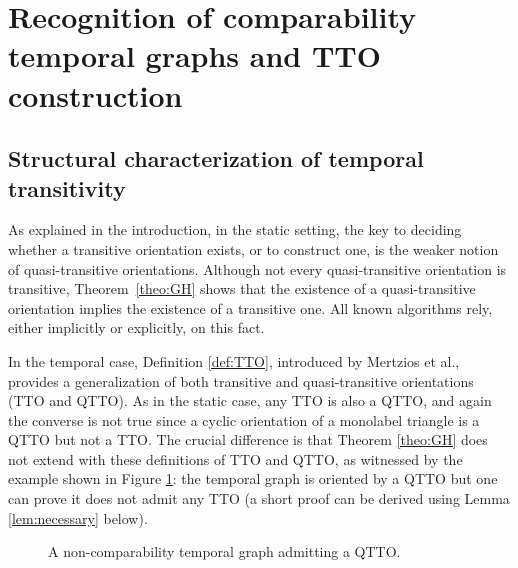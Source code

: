 \documentclass[runningheads]{llncs}
\begin{document}
\section{Recognition of comparability temporal graphs and TTO construction}
\label{sect:tto-algorithm}



\subsection{Structural characterization of temporal transitivity}

As explained in the introduction, in the static setting, the key to deciding whether a transitive orientation exists, or to construct one, is the weaker notion of quasi-transitive orientations. Although not every quasi-transitive orientation is transitive, Theorem~\ref{theo:GH} shows that the existence of a quasi-transitive orientation implies the existence of a transitive one. All known algorithms rely, either implicitly or explicitly, on this fact.


In the temporal case, Definition \ref{def:TTO}, introduced by Mertzios et al., provides a generalization of both transitive and quasi-transitive orientations (TTO and QTTO). As in the static case, any TTO  is also a QTTO, and again the converse is not true since a cyclic orientation of a monolabel triangle is a QTTO but not a TTO. The crucial difference is that Theorem \ref{theo:GH} does not extend with these definitions of TTO and QTTO, as witnessed by the example shown in Figure \ref{fig:qtto-not-tto}: the temporal graph is oriented by a QTTO but one can prove it does not admit any TTO (a short proof can be derived using Lemma \ref{lem:necessary} below).


\begin{figure}[H]
\begin{center}
\end{center}
\caption{A non-comparability temporal graph admitting a QTTO.}
\label{fig:qtto-not-tto}
\end{figure}
\end{document}
